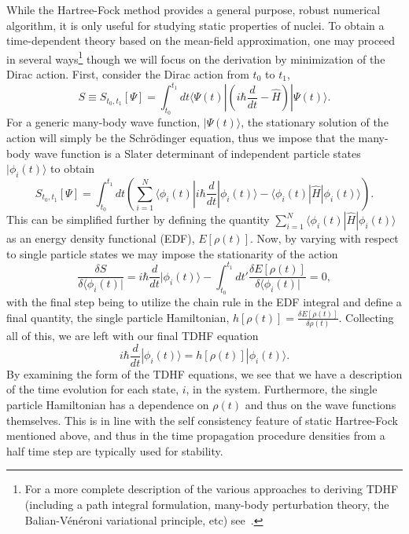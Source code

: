 While the Hartree-Fock method provides a general purpose, robust numerical algorithm, it is only useful for studying static properties of nuclei.
To obtain a time-dependent theory based on the mean-field approximation, one may proceed in several ways\footnote{For a more complete description of the various approaches to deriving TDHF (including a path integral formulation, many-body perturbation theory, the Balian-V\'en\'eroni variational principle, etc) see~\citep{simenel2018}.} though we will focus on the derivation by minimization of the Dirac action.
First, consider the Dirac action from $t_0$ to $t_1$,
\begin{equation}
S\equiv S_{t_0,t_1}[\Psi] = \int_{t_0}^{t_1}dt \langle \Psi(t) | \left(i\hbar\frac{d}{dt}-\hat{H}\right)|\Psi(t)\rangle.
\end{equation}
For a generic many-body wave function, $|\Psi(t)\rangle$, the stationary solution of the action will simply be the Schr\"odinger equation, thus we impose that the many-body wave function is a Slater determinant of independent particle states $|\phi_i(t)\rangle$ to obtain
\begin{equation}
S_{t_0,t_1}[\Psi] = \int_{t_0}^{t_1}dt \left(\sum_{i=1}^{N} \langle\phi_i(t)|i\hbar\frac{d}{dt}|\phi_i(t)\rangle-\langle\phi_i(t)|\hat{H}|\phi_i(t)\rangle\right).
\end{equation}
This can be simplified further by defining the quantity $\sum_{i=1}^{N}\langle\phi_i(t)|\hat{H}|\phi_i(t)\rangle$ as an energy density functional (EDF), $E[\rho(t)]$.
Now, by varying with respect to single particle states we may impose the stationarity of the action
\begin{equation}
\frac{\delta S}{\delta\langle\phi_i(t)|}=i\hbar\frac{d}{dt}|\phi_i(t)\rangle - \int_{t_0}^{t_1}dt' \frac{\delta E[\rho(t)]}{\delta\langle\phi_i(t)|} = 0,
\end{equation}
with the final step being to utilize the chain rule in the EDF integral and define a final quantity, the single particle Hamiltonian, $h[\rho(t)]=\frac{\delta E[\rho(t)]}{\delta\rho(t)}$.
Collecting all of this, we are left with our final TDHF equation
\begin{equation}
i\hbar\frac{d}{dt}|\phi_i(t)\rangle = h[\rho(t)]|\phi_i(t)\rangle.
\label{eq:tdhf}
\end{equation}
By examining the form of the TDHF equations, we see that we have a description of the time evolution for each state, $i$, in the system.
Furthermore, the single particle Hamiltonian has a dependence on $\rho(t)$ and thus on the wave functions themselves.
This is in line with the self consistency feature of static Hartree-Fock mentioned above, and thus in the time propagation procedure densities from a half time step are typically used for stability.

